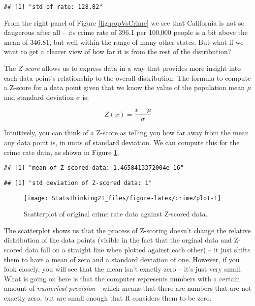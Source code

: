 \documentclass[]{book}
\newenvironment{Shaded}{\begin{snugshade}}{\end{snugshade}}
\newcommand{\KeywordTok}[1]{\textcolor[rgb]{0.13,0.29,0.53}{\textbf{#1}}}
\newcommand{\StringTok}[1]{\textcolor[rgb]{0.31,0.60,0.02}{#1}}
\newcommand{\OperatorTok}[1]{\textcolor[rgb]{0.81,0.36,0.00}{\textbf{#1}}}
\newcommand{\NormalTok}[1]{#1}
\theoremstyle{definition}
\theoremstyle{definition}
\theoremstyle{definition}
\theoremstyle{remark}
\begin{document}
\begin{Shaded}
\end{Shaded}

\begin{verbatim}
## [1] "std of rate: 128.82"
\end{verbatim}

From the right panel of Figure \ref{fig:popVsCrime} we see that
California is not so dangerous after all -- its crime rate of 396.1 per
100,000 people is a bit above the mean of 346.81, but well within the
range of many other states. But what if we want to get a clearer view of
how far it is from the rest of the distribution?

The \emph{Z-score} allows us to express data in a way that provides more
insight into each data point's relationship to the overall distribution.
The formula to compute a Z-score for a data point given that we know the
value of the population mean \(\mu\) and standard deviation \(\sigma\)
is:

\[
Z(x) = \frac{x - \mu}{\sigma}
\]

Intuitively, you can think of a Z-score as telling you how far away from
the mean any data point is, in units of standard deviation. We can
compute this for the crime rate data, as shown in Figure
\ref{fig:crimeZplot}.

\begin{verbatim}
## [1] "mean of Z-scored data: 1.4658413372004e-16"
\end{verbatim}

\begin{verbatim}
## [1] "std deviation of Z-scored data: 1"
\end{verbatim}

\begin{figure}
\texttt{[image: StatsThinking21\_files/figure-latex/crimeZplot-1]} \caption{Scatterplot of original crime rate data against Z-scored data.}\label{fig:crimeZplot}
\end{figure}

The scatterplot shows us that the process of Z-scoring doesn't change
the relative distribution of the data points (visible in the fact that
the orginal data and Z-scored data fall on a straight line when plotted
against each other) -- it just shifts them to have a mean of zero and a
standard deviation of one. However, if you look closely, you will see
that the mean isn't exactly zero -- it's just very small. What is going
on here is that the computer represents numbers with a certain amount of
\emph{numerical precision} - which means that there are numbers that are
not exactly zero, but are small enough that R considers them to be zero.
\end{document}
